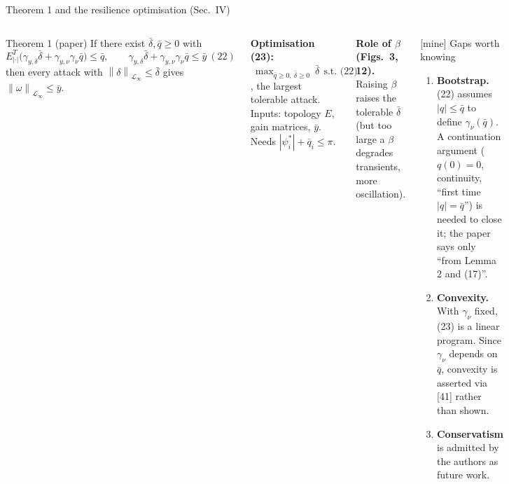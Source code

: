 \documentclass[aspectratio=169,9pt]{beamer}
\newcommand{\norm}[1]{\left\|#1\right\|}
\newcommand{\Linf}{\mathcal{L}_\infty}
\begin{document}
\begin{frame}[t]{Theorem 1 and the resilience optimisation (Sec.~IV)}
\footnotesize
\begin{columns}[T]
\begin{block}{Theorem 1 (paper)}
If there exist $\bar\delta,\bar q\ge0$ with
\[E^T_{|\cdot|}\bigl(\gamma_{y,\delta}\bar\delta+\gamma_{y,\nu}\gamma_\nu\bar q\bigr)\le\bar q,\qquad\gamma_{y,\delta}\bar\delta+\gamma_{y,\nu}\gamma_\nu\bar q\le\bar y\ (22)\]
then every attack with $\norm{\delta}_{\Linf}\le\bar\delta$ gives $\norm{\omega}_{\Linf}\le\bar y$.
\end{block}
\textbf{Optimisation (23):} $\ \max_{\bar q\ge0,\ \bar\delta\ge0}\ \bar\delta\ \ \text{s.t. (22)}$, the largest tolerable attack. Inputs: topology $E$, gain matrices, $\bar y$. Needs $|\psi_i^*|+\bar q_i\le\pi$.

\textbf{Role of $\beta$ (Figs.~3, 12).} Raising $\beta$ raises the tolerable $\bar\delta$ (but too large a $\beta$ degrades transients, more oscillation).
\begin{alertblock}{[mine] Gaps worth knowing}
\begin{enumerate}
\item \textbf{Bootstrap.} (22) assumes $|q|\le\bar q$ to define $\gamma_\nu(\bar q)$. A continuation argument ($q(0)=0$, continuity, ``first time $|q|=\bar q$'') is needed to close it; the paper says only ``from Lemma 2 and (17)''.
\item \textbf{Convexity.} With $\gamma_\nu$ fixed, (23) is a linear program. Since $\gamma_\nu$ depends on $\bar q$, convexity is asserted via [41] rather than shown.
\item \textbf{Conservatism} is admitted by the authors as future work.
\end{enumerate}
\end{alertblock}
\end{columns}
\end{frame}
\end{document}
